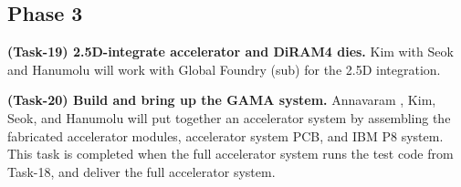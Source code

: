 \subsection{Phase 3}
\noindent
\textbf{(Task-19) 2.5D-integrate accelerator and DiRAM4 dies.}
Kim with Seok and Hanumolu will work with Global Foundry (sub) for the 2.5D integration.


\vspace{3pt}
\noindent
\textbf{(Task-20) Build and bring up the GAMA system.}
Annavaram , Kim, Seok, and Hanumolu will put together an accelerator system by assembling
the fabricated accelerator modules, accelerator system PCB, and IBM P8 system.
This task is completed when the full accelerator system runs the test code from Task-18, and deliver the full accelerator system.


\begin{comment}
Task 3.X: Our accelerator chip fabrication and chip-level testing \underline{Seok (Columbia), Kim (UIUC), Hanumolu (UIUC), Annavaram (USC), Hwu (UIUC)}
Completion criteria: fabricated chips, verified in the chip level
Approach: We will perform intensive pre-silicon verifications for functional, thermal, voltage integrity, noise, and testability aspects. We will tape-out the accelerator chip in a 28nm CMOS technology. We will test the accelerator chip without DiRAMs. 
Task 3.2: 2.5D integration of our accelerator chip and memory stacks, packaging, and testing \underline{?}
Completion criteria and deliverables: Functioning 2.5D integrated hardware of the accelerators and DiRAMs. 
Approach:  We will integrate the accelerator chip with two DiRAMs using a silicon interposer. 
The silicon interposer that creates 2,000 connection to the accelerator chip per DiRAM will be fabricated by a company (XXXXX). 
The interposer will be either connected to a custom PCB directly or enclosed on a BGA type package. 
If necessary, we will mount a off-the-shelf cooler, potentially modified to fit, on top of the accelerator chip. 
\end{comment}

